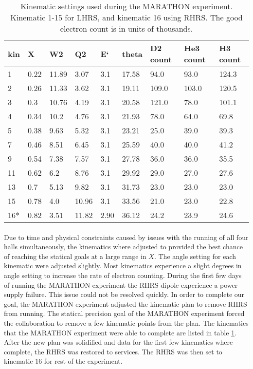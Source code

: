 \begin{table}[]
	\begin{tabular}{|l|l|l|l|l|l|l|l|l|}
		\hline
		kin & X    & W2    & Q2    & E`   & theta & D2 count & He3 count & H3 count \\ \hline
		1   & 0.22 & 11.89 & 3.07  & 3.1  & 17.58 & 94.0   & 93.0      & 124.3    \\ \hline
		2   & 0.26 & 11.33 & 3.62  & 3.1  & 19.11 & 109.0  & 103.0     & 120.5    \\ \hline
		3   & 0.3  & 10.76 & 4.19  & 3.1  & 20.58 & 121.0  & 78.0      & 101.1    \\ \hline
		4   & 0.34 & 10.2  & 4.76  & 3.1  & 21.93 & 78.0   & 64.0      & 69.8     \\ \hline
		5   & 0.38 & 9.63  & 5.32  & 3.1  & 23.21 & 25.0   & 39.0      & 39.3     \\ \hline
		7   & 0.46 & 8.51  & 6.45  & 3.1  & 25.59 & 40.0   & 40.0      & 41.2     \\ \hline
		9   & 0.54 & 7.38  & 7.57  & 3.1  & 27.78 & 36.0   & 36.0      & 35.5     \\ \hline
		11  & 0.62 & 6.2   & 8.76  & 3.1  & 29.92 & 29.0   & 27.0      & 27.6     \\ \hline
		13  & 0.7  & 5.13  & 9.82  & 3.1  & 31.73 & 23.0   & 23.0      & 23.0     \\ \hline
		15  & 0.78 & 4.0   & 10.96 & 3.1  & 33.56 & 21.0   & 23.0      & 22.8     \\ \hline
		16*  & 0.82 & 3.51  & 11.82 & 2.90 & 36.12 &24.2 &23.9& 24.6 \\ \hline

	\end{tabular}
	\caption{Kinematic settings used during the MARATHON experiment. Kinematic 1-15 for LHRS, and kinematic 16 using RHRS. The good electron count is in units of thousands. }
	\label{newkin}
\end{table}

\paragraph{}Due to time and physical constraints caused by issues with the running of all four halls simultaneously, the kinematics where adjusted to provided the best chance of reaching the statical goals at a large range in $X$. The angle setting for each kinematic were adjusted slightly. Most kinematics experience a slight degrees in angle setting to increase the rate of electron counting. During the first few days of running the MARATHON experiment the RHRS dipole experience a power supply failure. This issue could not be resolved quickly. In order to complete our goal, the MARATHON experiment adjusted the kinematic plan to remove RHRS from running. The statical precision goal of the MARATHON experiment forced the collaboration to remove a few kinematic points from the plan. The kinematics that the MARATHON experiment were able to complete are listed in table \ref{newkin}. After the new plan was solidified and data for the first few kinematics where complete, the RHRS was restored to services. The RHRS was then set to kinematic 16 for rest of the experiment.      

